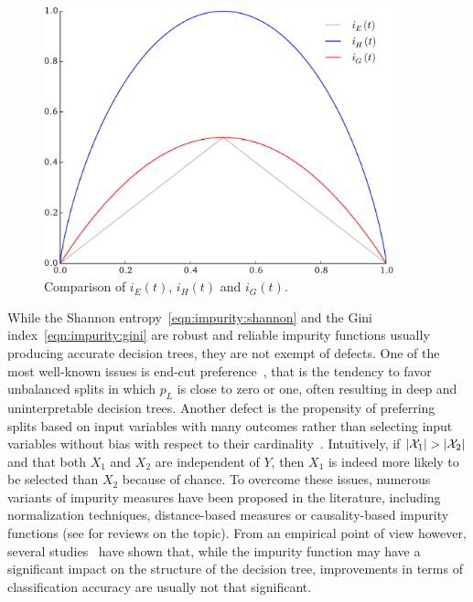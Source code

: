 \begin{figure}[h]
\centering
\includegraphics[width=0.9\textwidth]{figures/ch3_impurity_comparison.pdf}
\caption{Comparison of $i_E(t)$, $i_H(t)$ and $i_G(t)$.}
\label{fig:3:toy:impurity:comparison}
\end{figure}


While the Shannon entropy~\ref{eqn:impurity:shannon} and the Gini
index~\ref{eqn:impurity:gini} are robust and reliable impurity functions
usually producing accurate decision trees, they are not exempt of defects. One
of the most well-known issues is end-cut
preference~\citep{morgan:1973,breiman:1984}, that is the tendency to favor
unbalanced splits in which $p_L$ is close to zero or one,  often resulting in
deep and uninterpretable decision trees. Another defect is the propensity of
preferring splits based on input variables with many outcomes rather than
selecting input variables without bias with respect to their
cardinality~\citep{quinlan:1986,strobl:2007}. Intuitively, if $|{\cal X}_1| >
|{\cal X}_2|$ and that both $X_1$ and $X_2$ are independent of $Y$, then $X_1$
is indeed more likely to be selected than $X_2$  because of chance. To overcome
these issues, numerous variants of impurity measures have been proposed in the
literature, including normalization techniques, distance-based measures or
causality-based impurity functions (see
\citep{wehenkel:1996,zighed:2000,maimon:2005} for reviews on the topic). From
an empirical point of view however,  several
studies~\citep{mingers:1989b,miyakawa:1989,mantaras:1991} have shown that,
while the impurity function may have a significant impact on the structure of
the decision tree, improvements in terms of classification accuracy are usually
not that significant.


